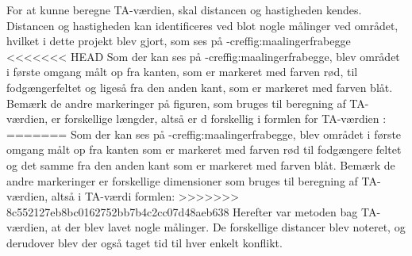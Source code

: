 For at kunne beregne TA-værdien, skal distancen og hastigheden kendes. Distancen og hastigheden kan identificeres ved blot nogle målinger ved området, hvilket i dette projekt blev gjort, som ses på -cref{fig:maalingerfrabegge}
<<<<<<< HEAD
Som der kan ses på -cref{fig:maalingerfrabegge}, blev området i første omgang målt op fra kanten, som er markeret med farven rød, til fodgængerfeltet og ligeså fra den anden kant, som er markeret med farven blåt. Bemærk de andre markeringer på figuren, som bruges til beregning af TA-værdien, er forskellige længder, altså er d forskellig i formlen for TA-værdien :%
=======
Som der kan ses på -cref{fig:maalingerfrabegge}, blev området i første omgang målt op fra kanten som er markeret med farven rød til fodgængere feltet og det samme fra den anden kant som er markeret med farven blåt. Bemærk de andre markeringer er forskellige dimensioner som bruges til beregning af TA-værdien, altså i TA-værdi formlen:
>>>>>>> 8c552127eb8bc0162752bb7b4c2cc07d48aeb638
Herefter var metoden bag TA-værdien, at der blev lavet nogle målinger. De forskellige distancer blev noteret, og derudover blev der også taget tid til hver enkelt konflikt.%

